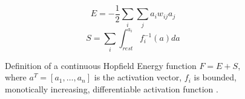 \begin{figure}[H]
  \centering
  \begin{equation}
    \label{eq:models-chl-hopfield-E}
    E = -\frac{1}{2}\sum_i\sum_ja_iw_{ij}a_j
  \end{equation} 
  \begin{equation}
    \label{eq:models-chl-hopfield-S}
    S = \sum_i \int_{rest}^{a_i} f_i^{-1}(a)da
  \end{equation} 
  \caption{Definition of a continuous Hopfield Energy function $F = E + S$, where $a^T = [a_1,\ldots,a_n]$ is the activation vector, $f_i$ is bounded, monotically increasing, differentiable activation function \citep{movellan1990contrastive}.} 
  \label{fig:models-chl-hopfield}
\end{figure}
   
